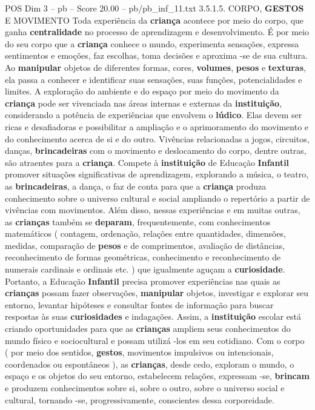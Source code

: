 \begin{textsample}{POS Dim 3 – pb – Score 20.00 – pb/pb\_inf\_11.txt}  \label{ex:f3_pos_088}
3.5.1.5.
CORPO, \textbf{GESTOS} E MOVIMENTO Toda experiência da \textbf{criança} acontece por meio do corpo, que ganha \textbf{centralidade} no processo de aprendizagem e desenvolvimento.
É por meio do seu corpo que a \textbf{criança} conhece o mundo, experimenta sensações, expressa sentimentos e emoções, faz escolhas, toma decisões e aproxima -se de sua cultura.
Ao \textbf{manipular} objetos de diferentes formas, cores, \textbf{volumes}, \textbf{pesos} e \textbf{texturas}, ela passa a conhecer e identificar suas sensações, suas funções, potencialidades e limites.
A exploração do ambiente e do espaço por meio do movimento da \textbf{criança} pode ser vivenciada nas áreas internas e externas da \textbf{instituição}, considerando a potência de experiências que envolvem o \textbf{lúdico}.
Elas devem ser ricas e desafiadoras e possibilitar a ampliação e o aprimoramento do movimento e do conhecimento acerca de si e do outro.
Vivências relacionadas a jogos, circuitos, danças, \textbf{brincadeiras} com o movimento e deslocamento do corpo, dentre outras, são atraentes para a \textbf{criança}.
Compete à \textbf{instituição} de Educação \textbf{Infantil} promover situações significativas de aprendizagem, explorando a música, o teatro, as \textbf{brincadeiras}, a dança, o faz de conta para que a \textbf{criança} produza conhecimento sobre o universo cultural e social ampliando o repertório a partir de vivências com movimentos.
Além disso, nessas experiências e em muitas outras, as \textbf{crianças} também se \textbf{deparam}, frequentemente, com conhecimentos matemáticos ( contagem, ordenação, relações entre quantidades, dimensões, medidas, comparação de \textbf{pesos} e de comprimentos, avaliação de distâncias, reconhecimento de formas geométricas, conhecimento e reconhecimento de numerais cardinais e ordinais etc. ) que igualmente aguçam a \textbf{curiosidade}.
Portanto, a Educação \textbf{Infantil} precisa promover experiências nas quais as \textbf{crianças} possam fazer observações, \textbf{manipular} objetos, investigar e explorar seu entorno, levantar hipóteses e consultar fontes de informação para buscar respostas às suas \textbf{curiosidades} e indagações.
Assim, a \textbf{instituição} escolar está criando oportunidades para que as \textbf{crianças} ampliem seus conhecimentos do mundo físico e sociocultural e possam utilizá -los em seu cotidiano.
Com o corpo ( por meio dos sentidos, \textbf{gestos}, movimentos impulsivos ou intencionais, coordenados ou espontâneos ), as \textbf{crianças}, desde cedo, exploram o mundo, o espaço e os objetos do seu entorno, estabelecem relações, expressam -se, \textbf{brincam} e produzem conhecimentos sobre si, sobre o outro, sobre o universo social e cultural, tornando -se, progressivamente, conscientes dessa corporeidade.

\end{textsample}
